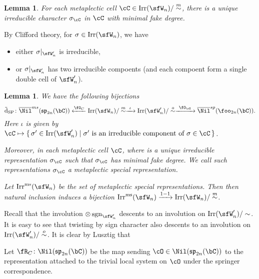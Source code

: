 \documentclass[12pt,a4paper]{amsart}
\def\fsp{\mathfrak{sp}}
\def\fso{\mathfrak{so}}
\newcommand{\sgn}{\operatorname{sgn}}
\numberwithin{equation}{section}
\newtheorem{lem}[thm]{Lemma}
\theoremstyle{remark}
\def\tdSP{\tilde{\mathrm{d}}_{\mathrm{SP}}}
\begin{document}
\begin{lem}
  For each metaplectic cell $\cC \in \Irr(\sfW_{n})/\msim$, there is a unique
  irreducible character $\sigma_{\cC}$ in $\cC$ with minimal fake degree.
\end{lem}


By Clifford theory, for $\sigma\in \Irr(\sfW_{n})$, we have
\begin{itemize}
        \item
either $\sigma|_{\sfW'_{n}}$ is
        irreducible,
        \item or $\sigma|_{\sfW'_{n}}$ has two irreducible compoents (and each
        compoent form a single double cell of $\sfW'_{n}$).
\end{itemize}


\begin{lem}
  We have the following bijections
  \[
  \tdSP \colon
    \bNil^{ms}(\fsp_{2n}(\bC))\xleftarrow{\Springer_{C}} \Irr(\sfW_{n})/\msim \xrightarrow{\ \iota \ } \Irr(\sfW'_{n})/\osim \xrightarrow{\ \SpringerO \ } \bNil^{sp}(\foo_{2n}(\bC)).
  \]
  Here $\iota$ is given by $\cC\mapsto \set{\sigma'\in \Irr(\sfW'_{n})| \text{$\sigma'$ is an irreducible component of $\sigma\in \cC$}}$.

  Moreover, in each metaplectic cell $\cC$, where is a unique irreducible
  representation $\sigma_{\cC}$ such that $\sigma_{\cC}$ has minimal fake
  degree. We call such representations $\sigma_{\cC}$ a metaplectic special
  representation.

  Let $\Irrms(\sfW_{n})$ be the set of metaplectic special representations.
  Then then natural inclusion induces a bijection
  $\Irrms(\sfW_{n})\xrightarrow{1-1} \Irr(\sfW_{n})/\msim$.
\end{lem}

Recall that the involution $\otimes \sgn_{\sfW'_{n}}$ descents to an involution
on $\Irr(\sfW'_{n})/\sim$.
It is easy to see that twisting by sign character also descents to an
involution on $\Irr(\sfW'_{n})/\osim$.
It is clear by Lusztig that



Let $\RSp\colon \Nil(\fsp_{2n}(\bC))$ be the map sending
$\cO\in \Nil(\fsp_{2n}(\bC))$ to the representation attached to the trivial
local system on $\cO$ under the springer correspondence.
\end{document}
